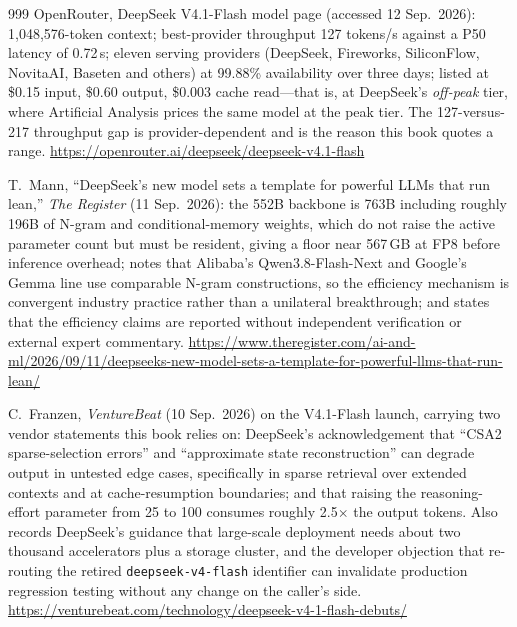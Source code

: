 \begin{thebibliography}{999}
 OpenRouter, DeepSeek V4.1-Flash model page (accessed 12 Sep.\ 2026): 1{,}048{,}576-token context; best-provider throughput 127 tokens/s against a P50 latency of 0.72\,s; eleven serving providers (DeepSeek, Fireworks, SiliconFlow, NovitaAI, Baseten and others) at 99.88\% availability over three days; listed at \$0.15 input, \$0.60 output, \$0.003 cache read---that is, at DeepSeek's \emph{off-peak} tier, where Artificial Analysis prices the same model at the peak tier. The 127-versus-217 throughput gap is provider-dependent and is the reason this book quotes a range. \url{https://openrouter.ai/deepseek/deepseek-v4.1-flash}

 T.~Mann, ``DeepSeek's new model sets a template for powerful LLMs that run lean,'' \emph{The Register} (11 Sep.\ 2026): the 552B backbone is 763B including roughly 196B of N-gram and conditional-memory weights, which do not raise the active parameter count but must be resident, giving a floor near 567\,GB at FP8 before inference overhead; notes that Alibaba's Qwen3.8-Flash-Next and Google's Gemma line use comparable N-gram constructions, so the efficiency mechanism is convergent industry practice rather than a unilateral breakthrough; and states that the efficiency claims are reported without independent verification or external expert commentary. \url{https://www.theregister.com/ai-and-ml/2026/09/11/deepseeks-new-model-sets-a-template-for-powerful-llms-that-run-lean/}

 C.~Franzen, \emph{VentureBeat} (10 Sep.\ 2026) on the V4.1-Flash launch, carrying two vendor statements this book relies on: DeepSeek's acknowledgement that ``CSA2 sparse-selection errors'' and ``approximate state reconstruction'' can degrade output in untested edge cases, specifically in sparse retrieval over extended contexts and at cache-resumption boundaries; and that raising the reasoning-effort parameter from 25 to 100 consumes roughly 2.5$\times$ the output tokens. Also records DeepSeek's guidance that large-scale deployment needs about two thousand accelerators plus a storage cluster, and the developer objection that re-routing the retired \texttt{deepseek-v4-flash} identifier can invalidate production regression testing without any change on the caller's side. \url{https://venturebeat.com/technology/deepseek-v4-1-flash-debuts/}


\end{thebibliography}
